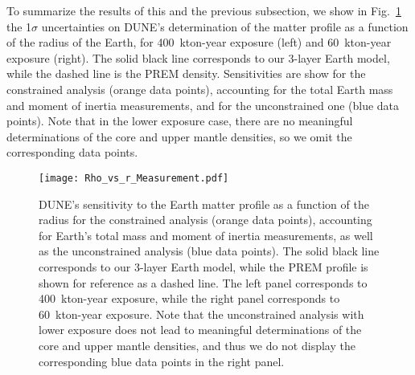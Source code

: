 To summarize the results of this and the previous subsection, we show in Fig.~\ref{fig:RhovsR} the 1$\sigma$ uncertainties on DUNE's determination of the matter profile as a function of the radius of the Earth, for 400~kton-year exposure (left) and 60~kton-year exposure (right).
The solid black line corresponds to our 3-layer Earth model, while the dashed line is the PREM density.
Sensitivities are show for the constrained analysis (orange data points), accounting for the total Earth mass and moment of inertia measurements, and for the unconstrained one (blue data points).
Note that in the lower exposure case, there are no meaningful determinations of the core and upper mantle densities, so we omit the corresponding data points.
\begin{figure}
\begin{center}
\texttt{[image: Rho\_vs\_r\_Measurement.pdf]}
\caption{DUNE's sensitivity to the Earth matter profile as a function of the radius for the constrained analysis (orange data points), accounting for Earth's total mass and moment of inertia measurements, as well as the unconstrained analysis (blue data points). The solid black line corresponds to our 3-layer Earth model, while the PREM profile is shown for reference as a dashed line. The left panel corresponds to 400~kton-year exposure, while the right panel corresponds to 60~kton-year exposure. Note that the unconstrained analysis with lower exposure does not lead to meaningful determinations of the core and upper mantle densities, and thus we do not display the corresponding blue data points in the right panel.\label{fig:RhovsR}}
\end{center}
\end{figure}





